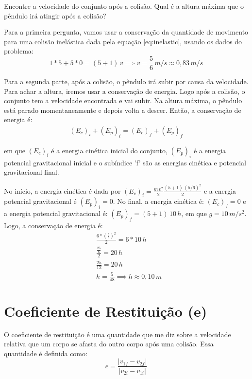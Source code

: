 \documentclass[12pt]{extarticle}
\newcommand{\<}{\langle}
\renewcommand{\>}{\rangle}
\theoremstyle{definition}
\begin{document}
Encontre a velocidade do conjunto após a colisão. Qual é a altura máxima que o pêndulo irá atingir após a colisão?

Para a primeira pergunta, vamos usar a conservação da quantidade de movimento para uma colisão inelástica dada pela equação \ref{eq:inelastic}, usando os dados do problema:
\begin{equation}
    1*5 + 5*0 = (5+1)\,v \implies \boxed{v = \frac{5}{6}\, m/s \approx 0,83\, m/s}
\end{equation}

Para a segunda parte, após a colisão, o pêndulo irá subir por causa da velocidade. Para achar a altura, iremos usar a conservação de energia. Logo após a colisão, o conjunto tem a velocidade encontrada e vai subir. Na altura máxima, o pêndulo está parado momentaneamente e depois volta a descer. Então, a conservação de energia é:
\begin{equation}
    \begin{split}
        (E_c)_i + (E_p)_i = (E_c)_f + (E_p)_f
    \end{split}
\end{equation}

\noindent em que $(E_c)_i$ é a energia cinética inicial do conjunto, $(E_p)_i$ é a energia potencial gravitacional inicial e o subíndice 'f' são as energias cinética e potencial gravitacional final.

No início, a energia cinética é dada por $(E_c)_i = \frac{m\,v^2}{2} \frac{(5+1)\,(5/6)^2}{2}$ e a energia potencial gravitacional é $(E_p)_i=0$. No final, a energia cinética é: $(E_c)_f = 0$ e a energia potencial gravitacional é: $(E_p)_f = (5+1)\,10\,h$, em que $g=10\,m/s^2$. Logo, a conservação de energia é:
\begin{equation}
    \begin{split}
        &\frac{6*\left(\frac{5}{6}\right)^2}{2} = 6*10\,h\\
        &\frac{\frac{25}{6}}{2} = 20\,h\\
        &\frac{25}{12} = 20\,h \\
        &h = \frac{5}{48} \implies \boxed{h \approx 0,10\, m}
    \end{split}
\end{equation}

\section{Coeficiente de Restituição (e)}

O coeficiente de restituição é uma quantidade que me diz sobre a velocidade relativa que um corpo se afasta do outro corpo após uma colisão. Essa quantidade é definida como:
\begin{equation}
    e = \frac{|v_{1f} - v_{2f}|}{|v_{2i}-v_{1i}|}
\end{equation}
\end{document}
